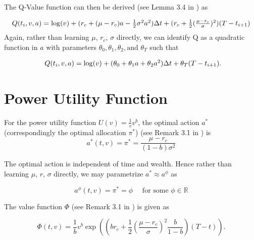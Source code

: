 The Q-Value function can then be derived (see Lemma 3.4 in \cite{FernandezKschonnek2022}) as

\begin{equation}\label{OptQLog}
    \begin{array}{l@{}l}
Q(t_i,v,a) 
    &{}= \log(v) + (r_c + (\mu-r_c)a -\frac{1}{2}\sigma^2a^2)\Delta t + (r_c+\frac{1}{2}(\frac{\mu-r_c}{\sigma})^2)(T-t_{i+1}) 
   
    
\end{array}
\end{equation}
Again, rather than learning $\mu$, $r_c$, $\sigma$ directly, we can identify Q as a quadratic function in $a$ with parameters $\theta_0,\theta_1,\theta_2,\text{and } \theta_T$ such that

\begin{equation}\label{paramlog}
\begin{array}{l@{}l}
Q(t_i,v,a) = \log(v) + (\theta_0 + \theta_1a + \theta_2a^2)\Delta t + \theta_T(T-t_{i+1}).
\end{array}
\end{equation}

 \section{Power Utility Function}
For the power utility function $U(v) = \frac{1}{v}v^b$, the optimal action $a^*$ (correspondingly the optimal allocation $\pi^*$) (see Remark 3.1 in \cite{FernandezKschonnek2022}) is \\

\begin{equation}\label{optimalpow}
a^*(t,v) = \pi^* = \frac{\mu-r_c}{(1-b)\sigma^2}
\end{equation}

The optimal action is independent of time and wealth. Hence rather than learning $\mu$, $r$, $\sigma$ directly, we may parametrize $a^* \approx a^{\phi}$ as

\begin{equation}\label{optimalappow}
a^\phi(t,v) = \pi^* = \phi \quad \text{ for some } \phi \in \mathbb{R}
\end{equation}

The value function $\Phi$ (see Remark 3.1 in \cite{FernandezKschonnek2022}) is given as

\begin{equation}\label{powUEquation}
\Phi(t,v)  = \frac{1}{b}v^b \exp \left( \left(br_c + \frac{1}{2}\left(\frac{\mu-r_c}{\sigma}\right)^2\frac{b}{1-b} \right)(T-t) \right).
\end{equation}

